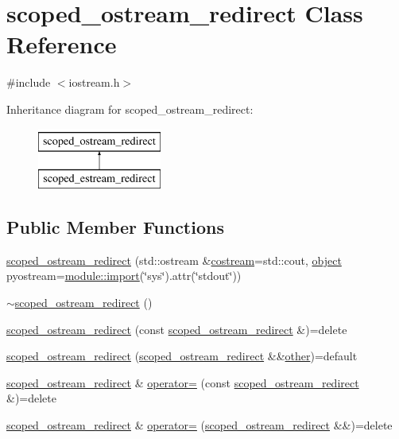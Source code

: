 \hypertarget{classscoped__ostream__redirect}{}\section{scoped\+\_\+ostream\+\_\+redirect Class Reference}
\label{classscoped__ostream__redirect}


{\ttfamily \#include $<$iostream.\+h$>$}

Inheritance diagram for scoped\+\_\+ostream\+\_\+redirect\+:\begin{figure}[H]
\begin{center}
\leavevmode
\includegraphics[height=2.000000cm]{classscoped__ostream__redirect}
\end{center}
\end{figure}
\subsection*{Public Member Functions}
\begin{DoxyCompactItemize}
\item 
\mbox{\hyperlink{classscoped__ostream__redirect_ad03c41b00f3efb1753c75e9e5962e1cd}{scoped\+\_\+ostream\+\_\+redirect}} (std\+::ostream \&\mbox{\hyperlink{classscoped__ostream__redirect_a1d9b813b2e4e5bd72b1a735a9e9b13cb}{costream}}=std\+::cout, \mbox{\hyperlink{classobject}{object}} pyostream=\mbox{\hyperlink{classmodule_a40817edef0ded5727701534bcded9982}{module\+::import}}(\char`\"{}sys\char`\"{}).attr(\char`\"{}stdout\char`\"{}))
\item 
\mbox{\hyperlink{classscoped__ostream__redirect_a95ab99016f73336eb87d275ee88adfbf}{$\sim$scoped\+\_\+ostream\+\_\+redirect}} ()
\item 
\mbox{\hyperlink{classscoped__ostream__redirect_a1246061ecc80a86fb4ccdaba343ce2fc}{scoped\+\_\+ostream\+\_\+redirect}} (const \mbox{\hyperlink{classscoped__ostream__redirect}{scoped\+\_\+ostream\+\_\+redirect}} \&)=delete
\item 
\mbox{\hyperlink{classscoped__ostream__redirect_a2c7e1be131aaf58cc07bd103b376c500}{scoped\+\_\+ostream\+\_\+redirect}} (\mbox{\hyperlink{classscoped__ostream__redirect}{scoped\+\_\+ostream\+\_\+redirect}} \&\&\mbox{\hyperlink{dictobject_8h_abd4733e17e86acb453bda62bc8b96adf}{other}})=default
\item 
\mbox{\hyperlink{classscoped__ostream__redirect}{scoped\+\_\+ostream\+\_\+redirect}} \& \mbox{\hyperlink{classscoped__ostream__redirect_a803809f8dbe73390bec2856a3cecb088}{operator=}} (const \mbox{\hyperlink{classscoped__ostream__redirect}{scoped\+\_\+ostream\+\_\+redirect}} \&)=delete
\item 
\mbox{\hyperlink{classscoped__ostream__redirect}{scoped\+\_\+ostream\+\_\+redirect}} \& \mbox{\hyperlink{classscoped__ostream__redirect_a3d1283c16eca978edac8101f1b891f5c}{operator=}} (\mbox{\hyperlink{classscoped__ostream__redirect}{scoped\+\_\+ostream\+\_\+redirect}} \&\&)=delete
\end{DoxyCompactItemize}
